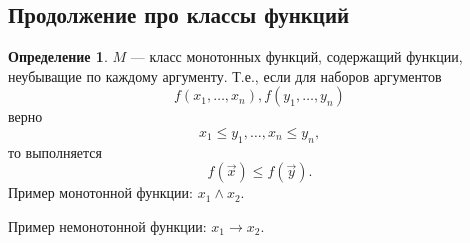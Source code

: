\documentclass[12pt]{article}
\let\im\rightarrow
\let\la\land
\theoremstyle{definition}
\newtheorem{definition}{Определение}[section]
\theoremstyle{statement}
\theoremstyle{theorem}
\begin{document}
\subsection{Продолжение про классы функций}

\begin{definition}
  $M$ --- класс монотонных функций, содержащий функции, неубыващие по
  каждому аргументу. Т.е., если для наборов аргументов
  \begin{displaymath}
    f(x_1, \dots, x_n), f(y_1, \dots, y_n)
  \end{displaymath}
  верно
  \begin{displaymath}
    x_1 \leqslant y_1, \dots, x_n \leqslant y_n,
  \end{displaymath}
  то выполняется
  \begin{displaymath}
    f(\vec{x}) \leqslant f(\vec{y}).
  \end{displaymath}
  Пример монотонной функции: $x_1 \la x_2$.

  Пример немонотонной функции: $x_1 \im x_2$.
\end{definition}
\end{document}
